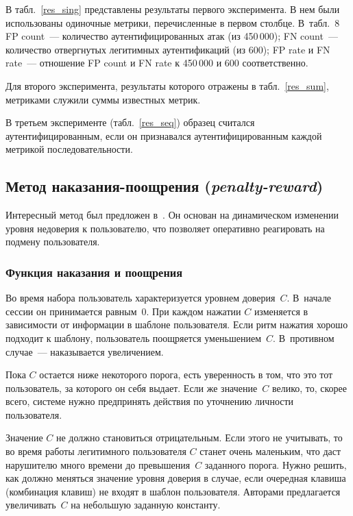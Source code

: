 \begin{multicols}{2}
В табл.~\ref{res_sing} представлены результаты первого эксперимента.
В нем были использованы одиночные метрики, перечисленные в первом
столбце. В~табл.~8 FP count~--- количество аутентифицированных атак (из
450\,000); FN count~--- количество отвергнутых легитимных
аутентификаций (из 600); FP rate и FN rate~--- отношение FP count и
FN rate к 450\,000 и 600 соответственно.

Для второго эксперимента, результаты которого отражены в
табл.~\ref{res_sum}, метриками служили суммы известных метрик.

В третьем эксперименте (табл.~\ref{res_seq}) образец считался
аутентифицированным, если он признавался аутентифицированным каждой
метрикой последовательности.

\subsection{Метод наказания-поощрения (\textit{penalty-reward})}

Интересный метод был предложен в~\cite{nisk}. Он основан на
динамическом изменении уровня недоверия к пользователю, что
позволяет оперативно реагировать на подмену пользователя.

\subsubsection{Функция наказания и поощрения}

Во время набора пользователь характеризуется уровнем доверия~$C$. 
В~начале сессии он принимается равным~0. При каждом нажатии $C$
изменяется в зависимости от информации в шаблоне пользователя. Если
ритм нажатия хорошо подходит к шаб\-ло\-ну, пользователь поощряется
уменьшением~$C$. В~противном случае~--- наказывается увеличением.

Пока $C$ остается ниже некоторого порога, есть уверенность в том,
что это тот пользователь, за которого он себя выдает. Если же
значение~$C$ велико, то, скорее всего, системе нужно предпринять
действия по уточнению личности пользователя.

Значение $C$ не должно становиться отрицательным. Если этого не
учитывать, то во время работы легитимного пользователя $C$ станет
очень маленьким, что даст нарушителю много времени до превышения~$C$
заданного порога. Нужно решить, как должно меняться значение уровня
доверия в случае, если очередная клавиша (комбинация клавиш) не
входят в шаблон пользователя. Авторами предлагается увеличивать~$C$
на небольшую заданную константу.


\end{multicols}
